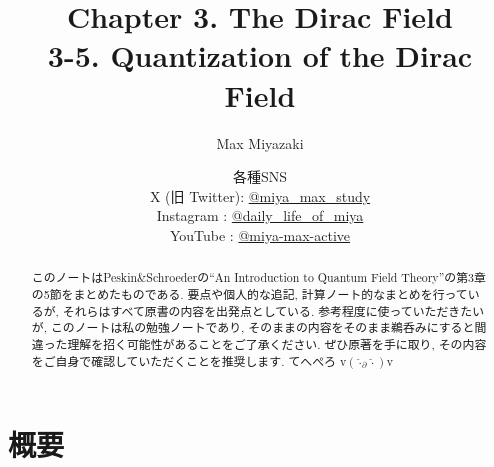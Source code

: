 \documentclass[a4paper,12pt]{article}
\title{Chapter 3. The Dirac Field\\
3-5. Quantization of the Dirac Field}
\date{各種SNS\\
    X (旧 Twitter): \href{https://x.com/miya_max_study}{@miya\_max\_study}\\
    Instagram : \href{https://www.instagram.com/daily_life_of_miya/}{@daily\_life\_of\_miya}\\
    YouTube : \href{https://www.youtube.com/@miya-max-active}{@miya-max-active}
    }
\author{Max Miyazaki}
\begin{document}
\maketitle

\vspace{1cm}
\begin{abstract}
    このノートはPeskin\&Schroederの``An Introduction to Quantum Field Theory''の第3章の5節をまとめたものである. 要点や個人的な追記, 計算ノート的なまとめを行っているが, それらはすべて原書の内容を出発点としている. 参考程度に使っていただきたいが, このノートは私の勉強ノートであり, そのままの内容をそのまま鵜呑みにすると間違った理解を招く可能性があることをご了承ください. ぜひ原著を手に取り, その内容をご自身で確認していただくことを推奨します. てへぺろ v$({\hat{\cdot}_\partial \hat{\cdot}})$v
\end{abstract}
    
    

\newpage
\color{blue}
\section*{概要}
\end{document}
